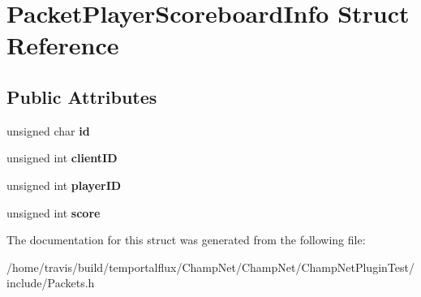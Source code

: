 \hypertarget{struct_packet_player_scoreboard_info}{\section{Packet\-Player\-Scoreboard\-Info Struct Reference}
\label{struct_packet_player_scoreboard_info}
}
\subsection*{Public Attributes}
\begin{DoxyCompactItemize}
\item 
\hypertarget{struct_packet_player_scoreboard_info_a57c4aeafb56667d32226fe2aacabb02b}{unsigned char {\bfseries id}}\label{struct_packet_player_scoreboard_info_a57c4aeafb56667d32226fe2aacabb02b}

\item 
\hypertarget{struct_packet_player_scoreboard_info_a1771129f213cfc2cb44e56ab54bee0a8}{unsigned int {\bfseries client\-I\-D}}\label{struct_packet_player_scoreboard_info_a1771129f213cfc2cb44e56ab54bee0a8}

\item 
\hypertarget{struct_packet_player_scoreboard_info_aaf646a832b6f674bcd54ceacc9592ae6}{unsigned int {\bfseries player\-I\-D}}\label{struct_packet_player_scoreboard_info_aaf646a832b6f674bcd54ceacc9592ae6}

\item 
\hypertarget{struct_packet_player_scoreboard_info_a33431a8aad88714cda248283d7b5ba5a}{unsigned int {\bfseries score}}\label{struct_packet_player_scoreboard_info_a33431a8aad88714cda248283d7b5ba5a}

\end{DoxyCompactItemize}


The documentation for this struct was generated from the following file\-:\begin{DoxyCompactItemize}
\item 
/home/travis/build/temportalflux/\-Champ\-Net/\-Champ\-Net/\-Champ\-Net\-Plugin\-Test/include/Packets.\-h\end{DoxyCompactItemize}
